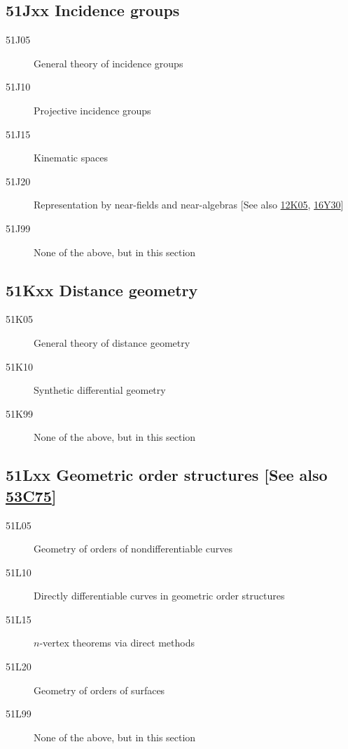 \documentclass[letterpaper]{article}
\begin{document}
\subsection*{51Jxx  Incidence groups }\label{51Jxx}
\begin{description}  
\item [51J05]\label{51J05} General theory of incidence groups
\item [51J10]\label{51J10} Projective incidence groups
\item [51J15]\label{51J15} Kinematic spaces
\item [51J20]\label{51J20} Representation by near-fields and near-algebras [See also \hyperref[12K05]{12K05}, \hyperref[16Y30]{16Y30}]
\item [51J99]\label{51J99} None of the above, but in this section
\end{description}
\subsection*{51Kxx  Distance geometry }\label{51Kxx}
\begin{description}  
\item [51K05]\label{51K05} General theory of distance geometry
\item [51K10]\label{51K10} Synthetic differential geometry
\item [51K99]\label{51K99} None of the above, but in this section
\end{description}
\subsection*{51Lxx  Geometric order structures [See also \hyperref[53C75]{53C75}] }\label{51Lxx}
\begin{description}  
\item [51L05]\label{51L05} Geometry of orders of nondifferentiable curves
\item [51L10]\label{51L10} Directly differentiable curves in geometric order structures
\item [51L15]\label{51L15} $n$-vertex theorems via direct methods
\item [51L20]\label{51L20} Geometry of orders of surfaces
\item [51L99]\label{51L99} None of the above, but in this section
\end{description}
\end{document}
